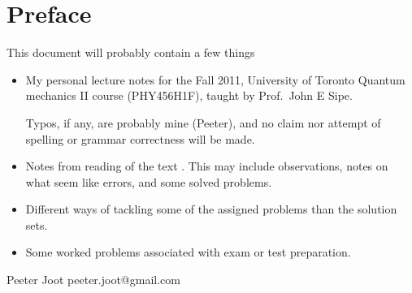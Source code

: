 \chapter*{Preface}\normalsize

This document will probably contain a few things

\begin{itemize}
\item My personal lecture notes for the Fall 2011, University of Toronto Quantum mechanics II course (PHY456H1F), taught by Prof.\ John E Sipe.

Typos, if any, are probably mine (Peeter), and no claim nor attempt of spelling or grammar correctness will be made.

\item Notes from reading of the text \citep{desai2009quantum}.  This may include observations, notes on what seem like errors, and some solved problems.

\item Different ways of tackling some of the assigned problems than the solution sets.

\item Some worked problems associated with exam or test preparation.

\end{itemize}

Peeter Joot  \quad peeter.joot@gmail.com 

